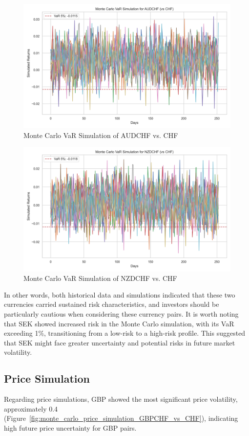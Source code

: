 \documentclass{article}
\begin{document}
\begin{figure}[H]
    \centering   
    \includegraphics[width=0.75\linewidth]{reports/figures/monte_carlo_var_simulation_AUDCHF_vs_CHF.png}
    \caption{Monte Carlo VaR Simulation of AUDCHF vs. CHF}  \label{fig:monte_carlo_var_simulation_AUDCHF_vs_CHF}
\end{figure}

\begin{figure}[H]
    \centering   \includegraphics[width=0.75\linewidth]{reports/figures/monte_carlo_var_simulation_NZDCHF_vs_CHF.png}
    \caption{Monte Carlo VaR Simulation of NZDCHF vs. CHF}  \label{fig:monte_carlo_var_simulation_NZDCHF_vs_CHF}
\end{figure}

In other words, both historical data and simulations indicated that these two currencies carried sustained risk characteristics, and investors should be particularly cautious when considering these currency pairs. It is worth noting that SEK showed increased risk in the Monte Carlo simulation, with its VaR exceeding 1\%, transitioning from a low-risk to a high-risk profile. This suggested that SEK might face greater uncertainty and potential risks in future market volatility.

\subsection{Price Simulation}
Regarding price simulations, GBP showed the most significant price volatility, approximately 0.4 (Figure~\ref{fig:monte_carlo_price_simulation_GBPCHF_vs_CHF}), indicating high future price uncertainty for GBP pairs. 
\end{document}
